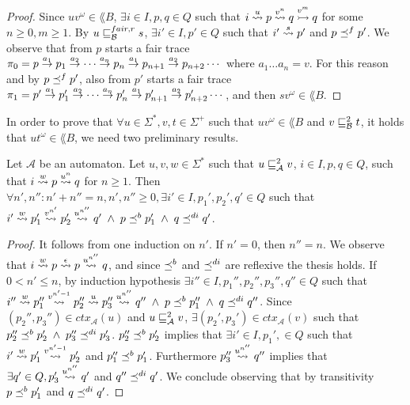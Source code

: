\begin{proof}
Since $uv ^{\omega} \in \lang{B}$, $\exists i \in I, p,q \in Q$ such that
$i \overset{u}{\rightsquigarrow} p \overset{v^n}{\rightsquigarrow} q \overset{v^m}{\rightarrowtail} q$ for some $n \geq 0,m \geq 1$.
By $u \sqsubseteq_{\mathcal{B}}^{fair,r} s$, $\exists i' \in I, p' \in Q$ such that $i' \overset{s}{\rightsquigarrow} p'$
and $p \preceq^{f} p'$.
We observe that from $p$ starts a fair trace
$\pi_0 = p \overset{a_1}{\rightarrow} p_1 \overset{a_2}{\rightarrow} \cdots \overset{a_n}{\rightarrow} p_n \overset{a_1}{\rightarrow} p_{n+1} \overset{a_2}{\rightarrow} p_{n+2} \cdots$
where $a_1 \dots a_n = v$.
For this reason and by $p \preceq^{f} p'$, also from $p'$ starts a fair trace
$\pi_1 = p' \overset{a_1}{\rightarrow} p_1' \overset{a_2}{\rightarrow} \cdots \overset{a_n}{\rightarrow} p_n' \overset{a_1}{\rightarrow} p_{n+1}' \overset{a_2}{\rightarrow} p_{n+2}' \cdots$,
and then $sv ^{\omega} \in \lang{B}$.
\end{proof}

In order to prove that $\forall u \in \Sigma^*, v,t \in \Sigma^+$ such that
$uv ^{\omega} \in \lang{B}$ and $v \sqsubseteq_{\mathcal{B}}^{2} t$, it holds that $ut ^{\omega} \in \lang{B}$,
we need two preliminary results.

\begin{lemma}
\label{lemma:substitution}
Let $\mathcal{A}$ be an automaton.
Let $u,v,w \in \Sigma^*$ such that $u \sqsubseteq_{\mathcal{A}}^{2} v$, $i \in I, p,q \in Q$, such that
$i \overset{w}{\rightsquigarrow} p \overset{u^n}{\rightsquigarrow} q$ for $n \geq 1$.
Then $\forall n',n'': n'+n'' = n, n',n'' \geq 0, \exists i' \in I, p_1', p_2', q' \in Q$ such that
$i' \overset{w}{\rightsquigarrow} p_1' \overset{v^{n'}}{\rightsquigarrow} p_2' \overset{u^{n''}}{\rightsquigarrow} q' \; \wedge \; p \preceq^b p_1' \; \wedge \; q \preceq^{di} q'$.
\end{lemma}

\begin{proof}
It follows from one induction on $n'$.
If $n'=0$, then $n''=n$.
We observe that $i \overset{w}{\rightsquigarrow} p \overset{\epsilon}{\rightsquigarrow} p \overset{u^{n''}}{\rightsquigarrow} q$,
and since $\preceq^b$ and $\preceq^{di}$ are reflexive the thesis holds.
If $0 < n' \leq n$, by induction hypothesis $\exists i'' \in I, p_1'', p_2'', p_3'', q'' \in Q$ such that
$i'' \overset{w}{\rightsquigarrow} p_1'' \overset{v^{n'-1}}{\rightsquigarrow} p_2'' \overset{u}{\rightsquigarrow} p_3'' \overset{u^{n''}}{\rightsquigarrow} q'' \; \wedge \; p \preceq^b p_1'' \; \wedge \; q \preceq^{di} q''$.
Since $(p_2'', p_3'') \in ctx_{\mathcal{A}}(u)$ and $u \sqsubseteq_{\mathcal{A}}^{2} v$, $\exists (p_2',p_3') \in ctx_{\mathcal{A}}(v)$ such that
$p_2'' \preceq^b p_2' \; \wedge \; p_3'' \preceq^{di} p_3'$.
$p_2'' \preceq^b p_2'$ implies that $\exists i' \in I, p_1', \in Q$ such that
$i' \overset{w}{\rightsquigarrow} p_1' \overset{v^{n'-1}}{\rightsquigarrow} p_2'$ and $p_1'' \preceq^b p_1'$.
Furthermore $p_3'' \overset{u^{n''}}{\rightsquigarrow} q''$ implies that $\exists q' \in Q, p_3' \overset{u^{n''}}{\rightsquigarrow} q'$ and $q'' \preceq^{di} q'$.
We conclude observing that by transitivity $p \preceq^b p_1'$ and $q \preceq^{di} q'$.
\end{proof}

